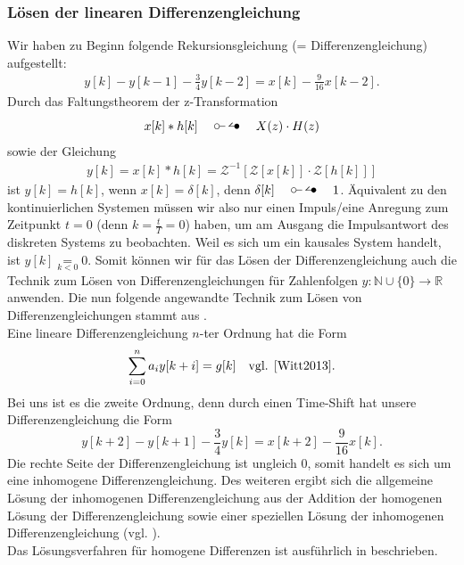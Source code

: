\documentclass[11pt,a4paper,DIV=12]{scrartcl}
\begin{document}
\subsubsection*{Lösen der linearen Differenzengleichung}
Wir haben zu Beginn folgende Rekursionsgleichung (= Differenzengleichung) aufgestellt:
%
\begin{gather}
	y[k]-y[k-1]-\frac{3}{4}y[k-2]=x[k]-\frac{9}{16}x[k-2].
\end{gather}
%
Durch das Faltungstheorem der z-Transformation
%
\begin{gather}
	x[k]\ast h[k]\quad\ztransf\quad X(z)\cdot H(z)
\end{gather}
%
sowie der Gleichung
%
\begin{gather}
	y[k]=x[k]\ast h[k]=\mathcal{Z}^{-1}\left[\mathcal{Z}\left[x[k]\right]\cdot\mathcal{Z}\left[h[k]\right]\right]
\end{gather}
%
ist $y[k]=h[k]$, wenn $x[k]=\delta[k]$, denn $\delta[k]\quad\ztransf\quad 1$.
%
Äquivalent zu den kontinuierlichen Systemen müssen wir also nur einen
Impuls/eine Anregung zum Zeitpunkt $t=0$ (denn $k=\frac{t}{T}=0$) haben,
um am Ausgang die Impulsantwort des diskreten Systems zu beobachten.
%
Weil es sich um ein kausales System handelt, ist $y[k]\underset{k<0}{=}0$.
%
Somit können wir für das Lösen der Differenzengleichung auch die Technik zum
Lösen von Differenzengleichungen für Zahlenfolgen
$y:\mathbb{N}\cup\{0\}\rightarrow\mathbb{R}$ anwenden.
%
Die nun folgende angewandte Technik zum Lösen von Differenzengleichungen stammt
aus \cite[Kap. 5]{Witt2013}.\\
%
Eine lineare Differenzengleichung $n$-ter Ordnung hat die Form
%
\begin{gather}
	\sum_{i=0}^na_iy[k+i]=g[k]\quad \text{vgl. \cite[Kap. 5 S. 80]{Witt2013}}.
\end{gather}
%
Bei uns ist es die zweite Ordnung, denn durch einen Time-Shift hat unsere
Differenzengleichung die Form
$$y[k+2]-y[k+1]-\frac{3}{4}y[k]=x[k+2]-\frac{9}{16}x[k].$$
%
Die rechte Seite der Differenzengleichung ist ungleich $0$,
somit handelt es sich um eine inhomogene Differenzengleichung.
%
Des weiteren ergibt sich die allgemeine Lösung der inhomogenen
Differenzengleichung aus der Addition der homogenen Lösung der
Differenzengleichung sowie einer speziellen Lösung der inhomogenen
Differenzengleichung (vgl. \cite[Kap. 5 S. 83]{Witt2013}).\\
%
Das Lösungsverfahren für homogene Differenzen ist ausführlich
in \cite[Kap. 5 S. 84-85]{Witt2013} beschrieben.\\
\end{document}
